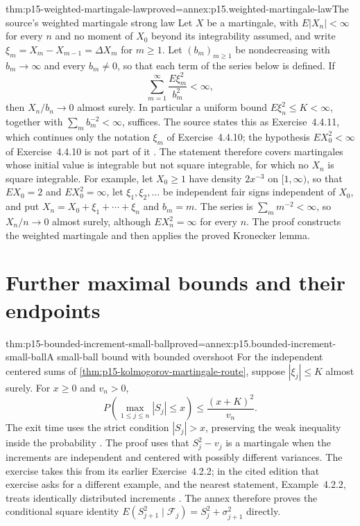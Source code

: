 \begin{hbtheorem}{thm:p15-weighted-martingale-law}{proved=annex:p15.weighted-martingale-law}{The source's weighted martingale strong law}
Let \(X\) be a martingale, with \(E|X_n|<\infty\) for every \(n\) and no
moment of \(X_0\) beyond its integrability assumed, and write
\(\xi_m=X_m-X_{m-1}=\Delta X_m\) for \(m\geq1\). Let \((b_m)_{m\geq1}\) be
nondecreasing with \(b_m\to\infty\) and every \(b_m\neq0\), so that each
term of the series below is defined. If
\[
                           \sum_{m=1}^\infty
                                  \frac{E\xi_m^2}{b_m^2}<\infty,
\]
then \(X_n/b_n\to0\) almost surely.
In particular a uniform bound \(E\xi_n^2\leq K<\infty\), together
with \(\sum_mb_m^{-2}<\infty\), suffices.
The source states this as Exercise~4.4.11, which continues only the
notation \(\xi_m\) of Exercise~4.4.10; the hypothesis \(EX_0^2<\infty\)
of Exercise~4.4.10 is not part of it
\cite[exs.~4.4.10--4.4.11, p.~239]{DurrettPTEAuthor2019}. The statement
therefore covers martingales whose initial value is integrable but not
square integrable, for which no \(X_n\) is square integrable. For
example, let \(X_0\geq1\) have density \(2x^{-3}\) on \([1,\infty)\), so
that \(EX_0=2\) and \(EX_0^2=\infty\), let \(\xi_1,\xi_2,\ldots\) be
independent fair signs independent of \(X_0\), and put
\(X_n=X_0+\xi_1+\cdots+\xi_n\) and \(b_m=m\). The series is
\(\sum_mm^{-2}<\infty\), so \(X_n/n\to0\) almost surely, although
\(EX_n^2=\infty\) for every \(n\).
The proof constructs the weighted martingale and then applies the
proved Kronecker lemma.
\end{hbtheorem}

\section{Further maximal bounds and their endpoints}
\label{sec:p15-maximal-refinements}

\begin{hbtheorem}{thm:p15-bounded-increment-small-ball}{proved=annex:p15.bounded-increment-small-ball}{A small-ball bound with bounded overshoot}
For the independent centered sums of
\cref{thm:p15-kolmogorov-martingale-route}, suppose
\(|\xi_j|\leq K\) almost surely. For \(x\geq0\) and \(v_n>0\),
\[
                 P\left(\max_{1\leq j\leq n}|S_j|\leq x\right)
                                      \leq\frac{(x+K)^2}{v_n}.
\]
The exit time uses the strict condition \(|S_j|>x\), preserving
the weak inequality inside the probability
\cite[ex.~4.4.6]{DurrettPTEAuthor2019}.
The proof uses that \(S_j^2-v_j\) is a martingale when the increments
are independent and centered with possibly different variances.
The exercise takes this from its earlier Exercise~4.2.2; in the cited
edition that exercise asks for a different example, and the nearest
statement, Example~4.2.2, treats identically distributed increments
\cite[example~4.2.2, p.~218; ex.~4.2.2, p.~223]{DurrettPTEAuthor2019}.
The annex therefore proves the conditional square identity
\(E(S_{j+1}^2\mid\mathcal F_j)=S_j^2+\sigma_{j+1}^2\) directly.
\end{hbtheorem}

